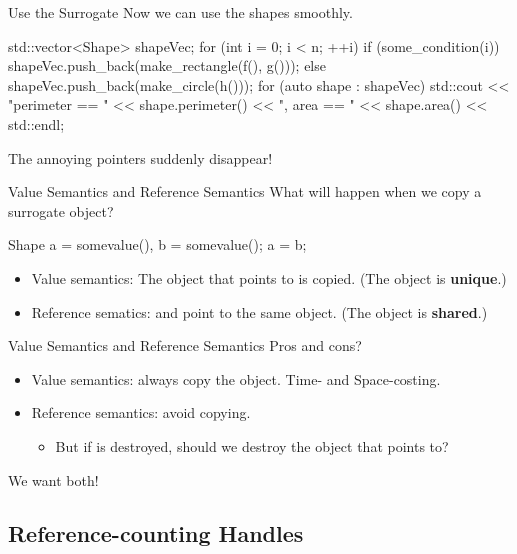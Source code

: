 \documentclass{beamer}
\begin{document}
\begin{frame}[fragile]{Use the Surrogate}
    Now we can use the shapes smoothly.
    \begin{cpp}
std::vector<Shape> shapeVec;
for (int i = 0; i < n; ++i) {
  if (some_condition(i))
    shapeVec.push_back(make_rectangle(f(), g()));
  else
    shapeVec.push_back(make_circle(h()));
}
for (auto shape : shapeVec) {
  std::cout << "perimeter == " << shape.perimeter()
            << ", area == " << shape.area() << std::endl;
}
    \end{cpp}
    The annoying pointers suddenly disappear!
\end{frame}

\begin{frame}[fragile]{Value Semantics and Reference Semantics}
    What will happen when we copy a surrogate object?
    \begin{cpp}
Shape a = somevalue(), b = somevalue();
a = b;
    \end{cpp}
    \begin{itemize}
        \item Value semantics: The object that  points to is copied. (The object is \textbf{unique}.)
        \item Reference sematics:  and  point to the same object. (The object is \textbf{shared}.)
    \end{itemize}
\end{frame}

\begin{frame}{Value Semantics and Reference Semantics}
    Pros and cons?
    \begin{itemize}
        \item Value semantics: always copy the object. Time- and Space-costing.
        \item Reference semantics: avoid copying.
        \begin{itemize}
            \item But if  is destroyed, should we destroy the object that  points to?
        \end{itemize}
    \end{itemize}
    \pause
    We want both!
\end{frame}

\subsection{Reference-counting Handles}
\end{document}

